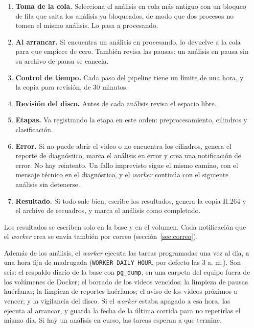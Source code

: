 \begin{enumerate}
  \item \textbf{Toma de la cola.} Selecciona el análisis en cola más antiguo con un bloqueo de fila que
  salta los análisis ya bloqueados, de modo que dos procesos no tomen el mismo análisis. Lo pasa a
  procesando.
  \item \textbf{Al arrancar.} Si encuentra un análisis en procesando, lo devuelve a la cola para que empiece
  de cero. También revisa las pausas: un análisis en pausa sin su archivo de pausa se cancela.
  \item \textbf{Control de tiempo.} Cada paso del pipeline tiene un límite de una hora, y la copia para revisión, de 30 minutos.
  \item \textbf{Revisión del disco.} Antes de cada análisis revisa el espacio libre.
  \item \textbf{Etapas.} Va registrando la etapa en este orden: preprocesamiento, cilindros y clasificación.
  \item \textbf{Error.} Si no puede abrir el video o no encuentra los cilindros, genera el reporte de
  diagnóstico, marca el análisis en error y crea una notificación de error. No hay reintento. Un fallo
  imprevisto sigue el mismo camino, con el mensaje técnico en el diagnóstico, y el \textit{worker} continúa
  con el siguiente análisis sin detenerse.
  \item \textbf{Resultado.} Si todo sale bien, escribe los resultados, genera la copia H.264 y el archivo de
  recuadros, y marca el análisis como completado.
\end{enumerate}

Los resultados se escriben solo en la base y en el volumen. Cada notificación que el \textit{worker} crea se
envía también por correo (sección~\ref{sec:correo}).

Además de los análisis, el \textit{worker} ejecuta las tareas programadas una vez al día, a una hora fija de
madrugada (\texttt{WORKER\_DAILY\_HOUR}, por defecto las 3 a. m.). Son seis: el respaldo diario de la base con
\texttt{pg\_dump}, en una carpeta del equipo fuera de los volúmenes de Docker; el borrado de los videos vencidos; la
limpieza de pausas huérfanas; la limpieza de reportes huérfanos; el aviso de los videos próximos a vencer; y la
vigilancia del disco. Si el
\textit{worker} estaba apagado a esa hora, las ejecuta al arrancar, y guarda la fecha de la última corrida para no
repetirlas el mismo día. Si hay un análisis en curso, las tareas esperan a que termine.


